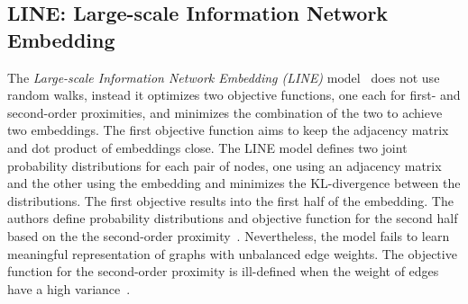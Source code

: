 \subsection{LINE: Large-scale Information Network Embedding}
\label{subsec:LINE}
The \emph{Large-scale Information Network Embedding (LINE)} model~ does not use random walks, instead it optimizes two objective functions, one each for first- and second-order proximities, and minimizes the combination of the two to achieve two embeddings. The first objective function aims to keep the adjacency matrix and dot product of embeddings close. The LINE model defines two joint probability distributions for each pair of nodes, one using an adjacency matrix and the other using the embedding and minimizes the KL-divergence between the distributions. The first objective results into the first half of the embedding. The authors define probability distributions and objective function for the second half based on the the second-order proximity~. Nevertheless, the model fails to learn meaningful representation of graphs with unbalanced edge weights. The objective function for the second-order proximity is ill-defined when the weight of edges have a high variance~.

